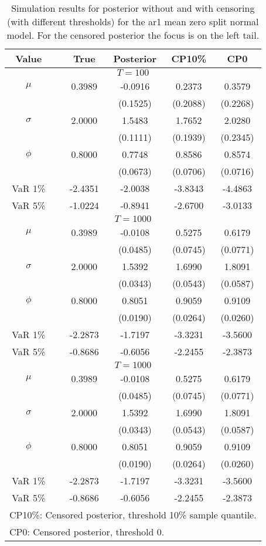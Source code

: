 { \renewcommand{\arraystretch}{1.2} 
\begin{table} 
\center 
\begin{tabular}{cc cccc} 
Value & & True & Posterior & CP10\% & CP0 \\ \hline 
\hline 
\multicolumn{6}{c}{$T =100$}  \\ 
\hline 
$\mu$&& 0.3989 & -0.0916 & 0.2373 & 0.3579  \\ 
&&   & (0.1525) & (0.2088) & (0.2268)  \\ 
$\sigma$&& 2.0000 & 1.5483 & 1.7652 & 2.0280  \\ 
&&   & (0.1111) & (0.1939) & (0.2345)  \\ 
$\phi$&& 0.8000 & 0.7748 & 0.8586 & 0.8574  \\ 
&&   & (0.0673) & (0.0706) & (0.0716)  \\ 
VaR 1\% && -2.4351 & -2.0038 & -3.8343 & -4.4863  \\ 
VaR 5\% && -1.0224 & -0.8941 & -2.6700 & -3.0133  \\ 
\hline 
\multicolumn{6}{c}{$T =1000$}  \\ 
\hline 
$\mu$&& 0.3989 & -0.0108 & 0.5275 & 0.6179  \\ 
&&   & (0.0485) & (0.0745) & (0.0771)  \\ 
$\sigma$&& 2.0000 & 1.5392 & 1.6990 & 1.8091  \\ 
&&   & (0.0343) & (0.0543) & (0.0587)  \\ 
$\phi$&& 0.8000 & 0.8051 & 0.9059 & 0.9109  \\ 
&&   & (0.0190) & (0.0264) & (0.0260)  \\ 
VaR 1\% && -2.2873 & -1.7197 & -3.3231 & -3.5600  \\ 
VaR 5\% && -0.8686 & -0.6056 & -2.2455 & -2.3873  \\ 
\hline 
\multicolumn{6}{c}{$T =1000$}  \\ 
\hline 
$\mu$&& 0.3989 & -0.0108 & 0.5275 & 0.6179  \\ 
&&   & (0.0485) & (0.0745) & (0.0771)  \\ 
$\sigma$&& 2.0000 & 1.5392 & 1.6990 & 1.8091  \\ 
&&   & (0.0343) & (0.0543) & (0.0587)  \\ 
$\phi$&& 0.8000 & 0.8051 & 0.9059 & 0.9109  \\ 
&&   & (0.0190) & (0.0264) & (0.0260)  \\ 
VaR 1\% && -2.2873 & -1.7197 & -3.3231 & -3.5600  \\ 
VaR 5\% && -0.8686 & -0.6056 & -2.2455 & -2.3873  \\ 
\hline 
\multicolumn{6}{l}{\footnotesize{CP10\%: Censored posterior, threshold 10\% sample quantile.}}  \\ 
\multicolumn{6}{l}{\footnotesize{CP0: Censored posterior, threshold 0.}} 
\end{tabular}
 \caption{Simulation results for posterior without and with censoring (with different thresholds) for the ar1 mean zero split normal model. For the censored posterior the focus is on the left tail. } 
\label{tab:ar1}  
\end{table}
}